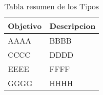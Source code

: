 \begin{table}[!ht]
\begin{center}
\begin{tabular}{|p{25mm}|p{80mm}|} \hline 
\textbf{Objetivo} & \textbf{Descripcion} \\ \hline
AAAA &
BBBB
\\
\hline

CCCC &
DDDD
\\
\hline

EEEE &
FFFF
\\
\hline

GGGG &
HHHH
\\
\hline

\end{tabular}
\end{center}
\caption{Tabla resumen de los Tipos}
\label{table:resOthers}
\end{table}

